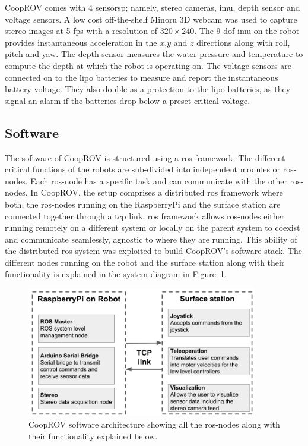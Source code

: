\documentclass {udthesis}
\begin{document}
CoopROV comes with 4 sensorsp; namely, stereo cameras, \gls{imu}, depth sensor and voltage sensors. A low cost off-the-shelf Minoru 3D webcam \cite{minoru} was used to capture stereo images at 5 \gls{fps} with a resolution of $320\times 240$. The 9-\gls{dof} \gls{imu} on the robot provides instantaneous acceleration in the $x$,$y$ and $z$ directions along with roll, pitch and yaw. The depth sensor measures the water pressure and temperature to compute the depth at which the robot is operating on. The voltage sensors are connected on to the \gls{lipo} batteries to measure and report the instantaneous battery voltage. They also double as a protection to the \gls{lipo} batteries, as they signal an alarm if the batteries drop below a preset critical voltage.

\subsection{Software}

The software of CoopROV is structured using a \gls{ros} framework. The different critical functions of the robots are sub-divided into independent modules or \gls{ros}-nodes. Each \gls{ros}-node has a specific task and can communicate with the other \gls{ros}-nodes. In CoopROV, the setup comprises a distributed \gls{ros} framework where both, the \gls{ros}-nodes running on the RaspberryPi and the surface station are connected together through a \gls{tcp} link. \gls{ros} framework allows \gls{ros}-nodes either running remotely on a different system or locally on the parent system to coexist and communicate seamlessly, agnostic to where they are running. This ability of the distributed \gls{ros} system was exploited to build CoopROV's software stack. The different nodes running on the robot and the surface station along with their functionality is explained in the system diagram in Figure~\ref{fig:cooprov_software}.
%
\begin{figure}
  \centering
  \includegraphics[width=0.9\textwidth]{cooprov_software}
  \caption[CoopROV software architecture]{CoopROV software architecture showing all the \gls{ros}-nodes along with their functionality explained below.}
  \label{fig:cooprov_software}
\end{figure} 
\end{document}
